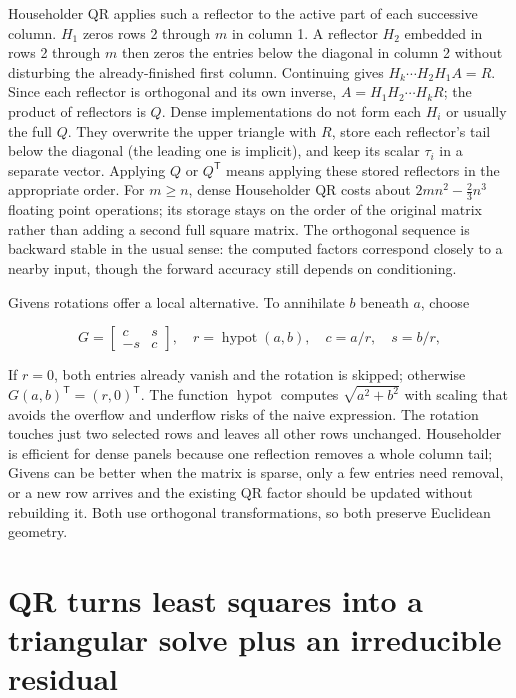 Householder QR applies such a reflector to the active part of each successive column. \(H_1\) zeros rows 2 through \(m\) in column 1. A reflector \(H_2\) embedded in rows 2 through \(m\) then zeros the entries below the diagonal in column 2 without disturbing the already-finished first column. Continuing gives \(H_k\cdots H_2H_1A=R\). Since each reflector is orthogonal and its own inverse, \(A=H_1H_2\cdots H_kR\); the product of reflectors is \(Q\). Dense implementations do not form each \(H_i\) or usually the full \(Q\). They overwrite the upper triangle with \(R\), store each reflector's tail below the diagonal (the leading one is implicit), and keep its scalar \(\tau_i\) in a separate vector. Applying \(Q\) or \(Q^\mathsf T\) means applying these stored reflectors in the appropriate order. For \(m\ge n\), dense Householder QR costs about \(2mn^2-\tfrac23n^3\) floating point operations; its storage stays on the order of the original matrix rather than adding a second full square matrix. The orthogonal sequence is backward stable in the usual sense: the computed factors correspond closely to a nearby input, though the forward accuracy still depends on conditioning.

Givens rotations offer a local alternative. To annihilate \(b\) beneath \(a\), choose

\[
G=\begin{bmatrix}c&s\\-s&c\end{bmatrix},\quad
r=\operatorname{hypot}(a,b),\quad c=a/r,\quad s=b/r,
\]

If \(r=0\), both entries already vanish and the rotation is skipped; otherwise \(G(a,b)^\mathsf T=(r,0)^\mathsf T\). The function \(\operatorname{hypot}\) computes \(\sqrt{a^2+b^2}\) with scaling that avoids the overflow and underflow risks of the naive expression. The rotation touches just two selected rows and leaves all other rows unchanged. Householder is efficient for dense panels because one reflection removes a whole column tail; Givens can be better when the matrix is sparse, only a few entries need removal, or a new row arrives and the existing QR factor should be updated without rebuilding it. Both use orthogonal transformations, so both preserve Euclidean geometry.

\section{QR turns least squares into a triangular solve plus an irreducible residual}\label{01-foundations-i-ch020-qr-turns-least-squares-into-a-triangular-solve-plus-an-irreducible-residual}

